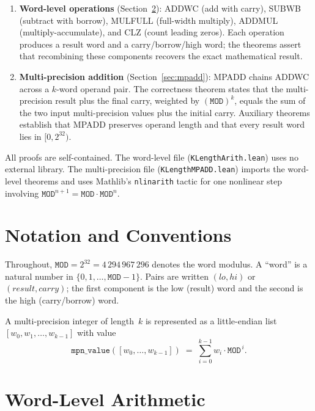 \documentclass[11pt,a4paper]{article}
\begin{document}
\begin{enumerate}[nosep]
\item \textbf{Word-level operations} (Section~\ref{sec:word}):
  ADDWC (add with carry), SUBWB (subtract with borrow), MULFULL
  (full-width multiply), ADDMUL (multiply-accumulate), and CLZ
  (count leading zeros).  Each operation produces a result word
  and a carry/borrow/high word; the theorems assert that recombining
  these components recovers the exact mathematical result.
\item \textbf{Multi-precision addition} (Section~\ref{sec:mpadd}):
  MPADD chains ADDWC across a $k$-word operand pair.  The
  correctness theorem states that the multi-precision result plus
  the final carry, weighted by $(\mathtt{MOD})^k$, equals the sum
  of the two input multi-precision values plus the initial carry.
  Auxiliary theorems establish that MPADD preserves operand length
  and that every result word lies in $[0, 2^{32})$.
\end{enumerate}

All proofs are self-contained.  The word-level file
(\texttt{KLengthArith.lean}) uses no external library.  The
multi-precision file (\texttt{KLengthMPADD.lean}) imports the
word-level theorems and uses Mathlib's \texttt{nlinarith} tactic for
one nonlinear step involving $\mathtt{MOD}^{n+1} = \mathtt{MOD}
\cdot \mathtt{MOD}^n$.

\section{Notation and Conventions}
\label{sec:notation}

Throughout, $\mathtt{MOD} = 2^{32} = 4\,294\,967\,296$ denotes the
word modulus.  A ``word'' is a natural number in $\{0, 1, \ldots,
\mathtt{MOD} - 1\}$.  Pairs are written $(lo, hi)$ or $(result,
carry)$; the first component is the low (result) word and the
second is the high (carry/borrow) word.

A multi-precision integer of length~$k$ is represented as a
little-endian list $[w_0, w_1, \ldots, w_{k-1}]$ with value
\[
  \mathtt{mpn\_value}([w_0, \ldots, w_{k-1}])
  \;=\; \sum_{i=0}^{k-1} w_i \cdot \mathtt{MOD}^{\,i}.
\]

\section{Word-Level Arithmetic}
\label{sec:word}
\end{document}
